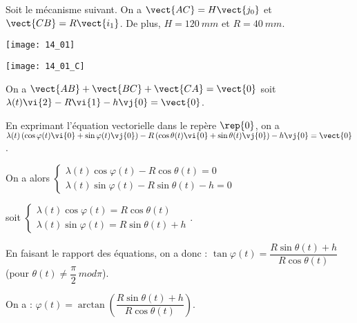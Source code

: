 \normaltrue \difficilefalse \tdifficilefalse
\correctiontrue


\setcounter{question}{0}
\ifcorrection
\else
{}
\fi

\ifprof
\else
Soit le mécanisme suivant. On a $\vect{AC}=H\vect{j_0}$ et $\vect{CB}=R\vect{i_1}$. De plus, 
$H=\SI{120}{mm}$ et $R=\SI{40}{mm}$. 

\begin{center}
\texttt{[image: 14\_01]}
\end{center}
\fi


\ifprof

\begin{center}
\texttt{[image: 14\_01\_C]}
\end{center}
\else
\fi

\ifprof
On a $\vect{AB}+\vect{BC}+\vect{CA}=\vect{0}$ soit 
$\lambda(t)\vi{2}-R\vi{1}-h\vj{0}=\vect{0}$.

En exprimant l'équation vectorielle dans le repère $\rep{0}$, on a 
$\lambda(t)\left( \cos\varphi(t)\vi{0}+\sin\varphi(t)\vj{0}\right)-R\left( \cos\theta(t)\vi{0}+\sin\theta(t)\vj{0}\right)-h\vj{0}=\vect{0}$.

On a alors 
$
\left\{
\begin{array}{l}
\lambda(t)\cos\varphi(t)-R \cos\theta(t)=0 \\
\lambda(t)\sin\varphi(t)-R\sin\theta(t)-h=0
\end{array}
\right.
$

soit 
$
\left\{
\begin{array}{l}
\lambda(t)\cos\varphi(t)=R \cos\theta(t) \\
\lambda(t)\sin\varphi(t)=R\sin\theta(t)+h
\end{array}
\right.
$.

En faisant le rapport des équations, on a donc : $\tan\varphi(t)=\dfrac{R\sin\theta(t)+h}{R \cos\theta(t)}$ (pour $\theta(t)\neq \dfrac{\pi}{2} \, mod \pi$).

\else
\fi

\ifprof
On a : $ \varphi(t)=\arctan \left( \dfrac{R\sin\theta(t)+h}{R \cos\theta(t)}\right)$.

